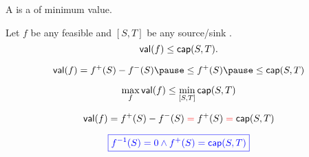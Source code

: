 \begin{frame}{}

  \pause
  \begin{definition}
    A  is a  of minimum value.
  \end{definition}

  \pause
  \vspace{0.50cm}
\end{frame}

\begin{frame}{}
  \begin{theorem}
    Let $f$ be any feasible  and $[S, T]$ be any source/sink .
    \[
      \textsf{val}(f) \le \textsf{cap}(S, T).
    \]
  \end{theorem}


  \pause
  \[
    \val(f) = f^{+}(S) - f^{-}(S) \pause \le f^{+}(S) \pause \le \capacity(S, T)
  \]
\end{frame}

\begin{frame}{}
  \begin{lemma}
    \[
      \max_{f} \textsf{val}(f) \le \min_{[S, T]} \textsf{cap}(S, T)
    \]
  \end{lemma}

  \pause
  \vspace{0.60cm}
  \begin{center}

    \pause
    \vspace{0.50cm}
  \end{center}
\end{frame}

\begin{frame}{}
  \[
    \textsf{val}(f) = f^{+}(S) - f^{-}(S) \;\textcolor{red}{=}\; f^{+}(S) \;\textcolor{red}{=}\; \textsf{cap}(S, T)
  \]

  \pause
  \[
    \textcolor{blue}{\boxed{f^{-1}(S) = 0 \land f^{+}(S) = \textsf{cap}(S, T)}}
  \]

\end{frame}


